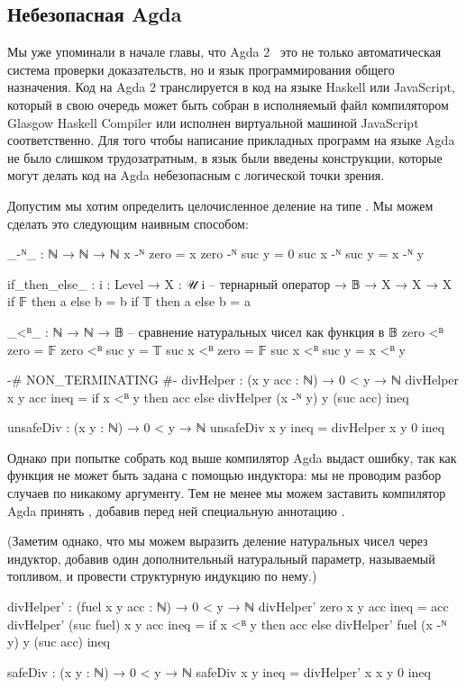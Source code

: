 \documentclass{article}[12pt]
\newcommand{\dash}{\textemdash\ }
\begin{document}
\subsection{Небезопасная Agda}

Мы уже упоминали в начале главы, что Agda 2 \dash это не только автоматическая система проверки доказательств,
но и язык программирования общего назначения. Код на Agda 2 транслируется в код на языке Haskell или
JavaScript, который в свою очередь может быть собран в исполняемый файл компилятором Glasgow Haskell
Compiler или исполнен виртуальной машиной JavaScript соответственно. Для того чтобы написание прикладных
программ на языке Agda не было слишком трудозатратным, в язык были введены конструкции, которые могут
делать код на Agda небезопасным с логической точки зрения.

Допустим мы хотим определить целочисленное деление на типе . Мы можем
сделать это следующим наивным способом:
\begin{code}
_-ᴺ_ : ℕ → ℕ → ℕ
x -ᴺ zero = x
zero -ᴺ suc y = 0
suc x -ᴺ suc y = x -ᴺ y

if_then_else_ : {i : Level} → {X : 𝒰 i} -- тернарный оператор
                → 𝔹 → X → X → X
if 𝔽 then a else b = b
if 𝕋 then a else b = a

_<ᴮ_ : ℕ → ℕ → 𝔹 -- сравнение натуральных чисел как функция в 𝔹
zero <ᴮ zero = 𝔽
zero <ᴮ suc y = 𝕋
suc x <ᴮ zero = 𝔽
suc x <ᴮ suc y = x <ᴮ y

{-# NON_TERMINATING #-}
divHelper : (x y acc : ℕ) → 0 < y → ℕ
divHelper x y acc ineq = 
    if x <ᴮ y then acc else divHelper (x -ᴺ y) y (suc acc) ineq

unsafeDiv : (x y : ℕ) → 0 < y → ℕ
unsafeDiv x y ineq = divHelper x y 0 ineq
\end{code}

Однако при попытке собрать код выше компилятор Agda выдаст ошибку, так как функция 
не может быть задана с помощью индуктора: мы не проводим разбор случаев по никакому аргументу. Тем не менее
мы можем заставить компилятор Agda принять , добавив перед ней специальную
аннотацию .

(Заметим однако, что мы можем выразить деление натуральных чисел через индуктор, добавив один дополнительный
натуральный параметр, называемый топливом, и провести структурную индукцию по нему.)
\begin{code}
divHelper' : (fuel x y acc : ℕ) → 0 < y → ℕ
divHelper' zero x y acc ineq = acc
divHelper' (suc fuel) x y acc ineq = 
    if x <ᴮ y then acc else divHelper' fuel (x -ᴺ y) y (suc acc) ineq

safeDiv : (x y : ℕ) → 0 < y → ℕ
safeDiv x y ineq = divHelper' x x y 0 ineq
\end{code}
\end{document}

